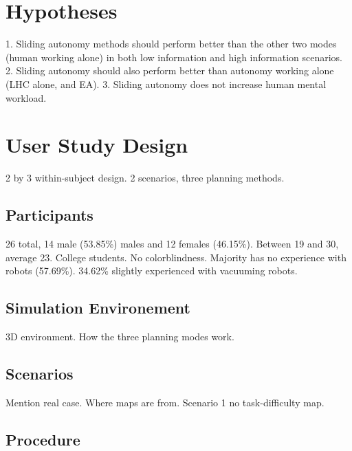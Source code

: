 \documentclass[journal]{IEEEtran}
\begin{document}
\section{Hypotheses} 
\label{sec:Hypotheses}

1. Sliding autonomy methods should perform better than the other two modes (human working alone) in both low information and high information scenarios.
2. Sliding autonomy should also perform better than autonomy working alone (LHC alone, and EA).
3. Sliding autonomy does not increase human mental workload.

\section{User Study Design} 
\label{sec:Design}

2 by 3 within-subject design. 2 scenarios, three planning methods.


\subsection{Participants}

26 total, 14 male (53.85\%) males and 12 females (46.15\%). Between 19 and 30, average 23. College students. No colorblindness. Majority has no experience with robots (57.69\%). 34.62\% slightly experienced with vacuuming robots.


\subsection{Simulation Environement}

3D environment. 
How the three planning modes work.


\subsection{Scenarios}

Mention real case. Where maps are from.
Scenario 1 no task-difficulty map.

\subsection{Procedure}
\end{document}
